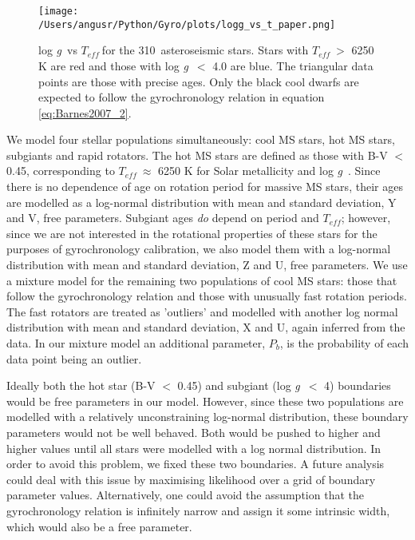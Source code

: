 \documentclass[10pt,preprint]{aastex}
\newcommand{\logg}{log \emph{g}~}
\newcommand{\teff}{$T_{eff}~$}
\newcommand{\nastero}{310~}
\begin{document}
\begin{figure}[ht]
\begin{center}
\texttt{[image: /Users/angusr/Python/Gyro/plots/logg\_vs\_t\_paper.png]}
\caption{\logg vs \teff for the \nastero asteroseismic stars. Stars with \teff $>$ 6250 K are red and those with \logg $<$ 4.0 are blue. The triangular data points are those with precise ages. Only the black cool dwarfs are expected to follow the gyrochronology relation in equation \ref{eq:Barnes2007_2}.}
\label{fig:p_vs_a}
\end{center}
\end{figure}

We model four stellar populations simultaneously: cool MS stars, hot MS stars, subgiants and rapid rotators.
The hot MS stars are defined as those with B-V $<$ 0.45, corresponding to \teff $\approx$ 6250 K for Solar metallicity and \logg.
Since there is no dependence of age on rotation period for massive MS stars, their ages are modelled as a log-normal distribution with mean and standard deviation, Y and V, free parameters.
Subgiant ages \emph{do} depend on period and $T_{eff}$; however, since we are not interested in the rotational properties of these stars for the purposes of gyrochronology calibration, we also model them with a log-normal distribution with mean and standard deviation, Z and U, free parameters.
We use a mixture model for the remaining two populations of cool MS stars: those that follow the gyrochronology relation and those with unusually fast rotation periods.
The fast rotators are treated as 'outliers' and modelled with another log normal distribution with mean and standard deviation, X and U, again inferred from the data.
In our mixture model an additional parameter, $P_b$, is the probability of each data point being an outlier.

Ideally both the hot star (B-V $<$ 0.45) and subgiant (\logg $<$ 4) boundaries would be free parameters in our model.
However, since these two populations are modelled with a relatively unconstraining log-normal distribution, these boundary parameters would not be well behaved.
Both would be pushed to higher and higher values until all stars were modelled with a log normal distribution.
In order to avoid this problem, we fixed these two boundaries.
A future analysis could deal with this issue by maximising likelihood over a grid of boundary parameter values.
Alternatively, one could avoid the assumption that the gyrochronology relation is infinitely narrow and assign it some intrinsic width, which would also be a free parameter.
\end{document}
